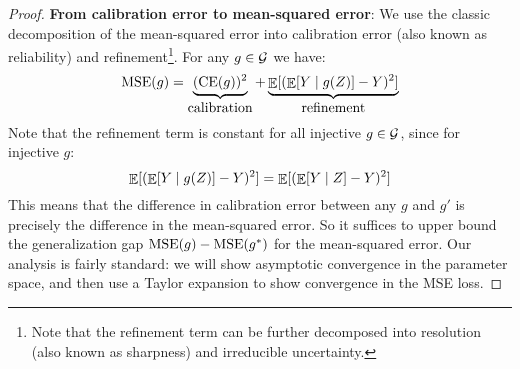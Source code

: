 \begin{proof}

\textbf{From calibration error to mean-squared error}: We use the classic decomposition of the mean-squared error into calibration error (also known as reliability) and refinement\footnote{Note that the refinement term can be further decomposed into resolution (also known as sharpness) and irreducible uncertainty.}. For any $g \in \mathcal{G}{}$ we have:
\[ \textup{MSE}(g) = \underbrace{(\textup{CE}(g))^2}_{\mbox{calibration}} + \underbrace{\mathop{\mathbb{E}}[(\mathop{\mathbb{E}}[Y \mid g(Z)] - Y)^2]}_{\mbox{refinement}} \]
Note that the refinement term is constant for all injective $g \in \mathcal{G}{}$, since for injective $g$:
\[ \mathop{\mathbb{E}}[(\mathop{\mathbb{E}}[Y \mid g(Z)] - Y)^2] = \mathop{\mathbb{E}}[(\mathop{\mathbb{E}}[Y \mid Z] - Y)^2] \]
This means that the difference in calibration error between any $g$ and $g'$ is precisely the difference in the mean-squared error. So it suffices to upper bound the generalization gap $\textup{MSE}(g) - \textup{MSE}(g^*)$ for the mean-squared error. Our analysis is fairly standard: we will show asymptotic convergence in the parameter space, and then use a Taylor expansion to show convergence in the MSE loss.


\end{proof}
